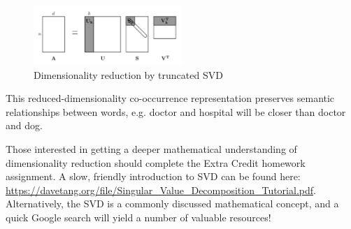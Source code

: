\begin{figure}[h]
    \centering
    \includegraphics[width=0.5\textwidth]{svd.png}
    \caption{Dimensionality reduction by truncated SVD}
    \label{fig:svd}
\end{figure}

This reduced-dimensionality co-occurrence representation preserves semantic relationships between words, e.g. doctor and hospital will be closer than doctor and dog. \newline

Those interested in getting a deeper mathematical understanding of dimensionality reduction should complete the Extra Credit homework assignment. A slow, friendly introduction to SVD can be found here: \url{https://davetang.org/file/Singular_Value_Decomposition_Tutorial.pdf}. Alternatively, the SVD is a commonly discussed mathematical concept, and a quick Google search will yield a number of valuable resources! 